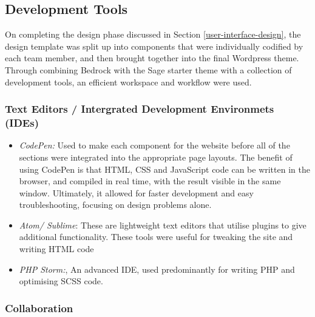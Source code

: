 \documentclass[fontsize=11pt]{extarticle}
\numberwithin{figure}{section} %
\numberwithin{table}{section}%
\providecommand{\tightlist}{%
  \setlength{\itemsep}{0pt}\setlength{\parskip}{0pt}}
\begin{document}
\hypertarget{development-tools}{%
\subsection{Development Tools}\label{development-tools}}

On completing the design phase discussed in Section
\ref{user-interface-design}, the design template was split up into
components that were individually codified by each team member, and then
brought together into the final Wordpress theme. Through combining
Bedrock with the Sage starter theme with a collection of development
tools, an efficient workspace and workflow were used.

\hypertarget{text-editors-intergrated-development-environmets-ides}{%
\subsubsection{Text Editors / Intergrated Development Environmets
(IDEs)}\label{text-editors-intergrated-development-environmets-ides}}

\begin{itemize}
\tightlist
\item
  \emph{CodePen:} Used to make each component for the website before all
  of the sections were integrated into the appropriate page layouts. The
  benefit of using CodePen is that HTML, CSS and JavaScript code can be
  written in the browser, and compiled in real time, with the result
  visible in the same window. \cite{p19} Ultimately, it allowed for
  faster development and easy troubleshooting, focusing on design
  problems alone.
\item
  \emph{Atom/ Sublime}: These are lightweight text editors that utilise
  plugins to give additional functionality. These tools were useful for
  tweaking the site and writing HTML code
\item
  \emph{PHP Storm:}, An advanced IDE, used predominantly for writing PHP
  and optimising SCSS code.
\end{itemize}

\hypertarget{collaboration}{%
\subsubsection{Collaboration}\label{collaboration}}
\end{document}
